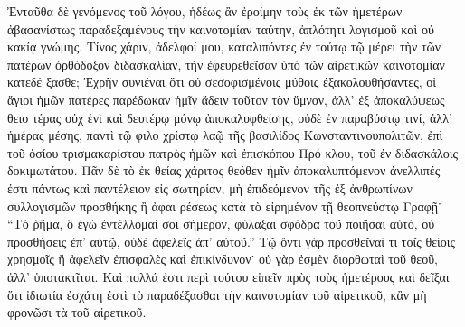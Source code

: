 Ἐνταῦθα δὲ γενόμενος τοῦ λόγου, ἡδέως ἂν ἐροίμην
τοὺς ἐκ τῶν ἡμετέρων ἀβασανίστως παραδεξαμένους τὴν
καινοτομίαν ταύτην, ἁπλότητι λογισμοῦ καὶ οὐ κακίᾳ
γνώμης. Τίνος χάριν, ἀδελφοί μου, καταλιπόντες ἐν τούτῳ
τῷ μέρει τὴν τῶν πατέρων ὀρθόδοξον διδασκαλίαν, τὴν
ἐφευρεθεῖσαν ὑπὸ τῶν αἱρετικῶν καινοτομίαν κατεδέ%
ξασθε; Ἐχρῆν συνιέναι ὅτι οὐ σεσοφισμένοις μύθοις
ἐξακολουθήσαντες, οἱ ἅγιοι ἡμῶν πατέρες παρέδωκαν
ἡμῖν ἄδειν τοῦτον τὸν ὕμνον, ἀλλ’ ἐξ ἀποκαλύψεως θειο%
τέρας οὐχ ἑνὶ καὶ δευτέρῳ μόνῳ ἀποκαλυφθείσης, οὐδὲ
ἐν παραβύστῳ τινί, ἀλλ’ ἡμέρας μέσης, παντὶ τῷ φιλο%
χρίστῳ λαῷ τῆς βασιλίδος Κωνσταντινουπολιτῶν, ἐπὶ τοῦ
ὁσίου τρισμακαρίστου πατρὸς ἡμῶν καὶ ἐπισκόπου Πρό%
κλου, τοῦ ἐν διδασκάλοις δοκιμωτάτου. Πᾶν δὲ τὸ ἐκ
θείας χάριτος θεόθεν ἡμῖν ἀποκαλυπτόμενον ἀνελλιπές
ἐστι πάντως καὶ παντέλειον εἰς σωτηρίαν, μὴ ἐπιδεόμενον
τῆς ἐξ ἀνθρωπίνων συλλογισμῶν προσθήκης ἢ ἀφαι%
ρέσεως κατὰ τὸ εἰρημένον τῇ θεοπνεύστῳ Γραφῇ˙ \enquote{Τὸ
ῥῆμα, ὃ ἐγὼ ἐντέλλομαί σοι σήμερον, φύλαξαι σφόδρα
τοῦ ποιῆσαι αὐτό, οὐ προσθήσεις ἐπ’ αὐτῷ, οὐδὲ ἀφελεῖς
ἀπ’ αὐτοῦ.} Τῷ ὄντι γὰρ προσθεῖναί τι τοῖς θείοις χρησμοῖς
ἢ ἀφελεῖν ἐπισφαλὲς καὶ ἐπικίνδυνον˙ οὐ γὰρ ἐσμὲν
διορθωταὶ τοῦ θεοῦ, ἀλλ’ ὑποτακτῖται. Καὶ πολλά ἐστι
περὶ τούτου εἰπεῖν πρὸς τοὺς ἡμετέρους καὶ δεῖξαι ὅτι
ἰδιωτία ἐσχάτη ἐστὶ τὸ παραδέξασθαι τὴν καινοτομίαν
τοῦ αἱρετικοῦ, κἂν μὴ φρονῶσι τὰ τοῦ αἱρετικοῦ.

